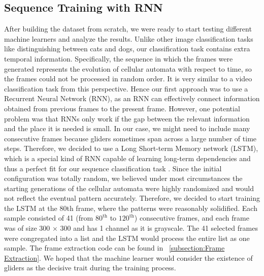 \documentclass[12pt]{article}
\numberwithin{figure}{section} %
\begin{document}
\subsection{Sequence Training with RNN}
After building the dataset from scratch, we were ready to start testing different machine learners and analyze the results. Unlike other image classification tasks like distinguishing between cats and dogs, our classification task contains extra temporal information. Specifically, the sequence in which the frames were generated represents the evolution of cellular automata with respect to time, so the frames could not be processed in random order. It is very similar to a video classification task from this perspective. Hence our first approach was to use a Recurrent Neural Network (RNN), as an RNN can effectively connect information obtained from previous frames to the present frame. However, one potential problem was that RNNs only work if the gap between the relevant information and the place it is needed is small. In our case, we might need to include many consecutive frames because gliders sometimes span across a large number of time steps. Therefore, we decided to use a Long Short-term Memory network (LSTM), which is a special kind of RNN capable of learning long-term dependencies and thus a perfect fit for our sequence classification task \cite{LSTM}. Since the initial configuration was totally random, we believed under most circumstances the starting generations of the cellular automata were highly randomized and would not reflect the eventual pattern accurately. Therefore, we decided to start training the LSTM at the 80th frame, where the patterns were reasonably solidified. Each sample consisted of 41 (from $80^{\text{th}}$ to $120^{\text{th}}$) consecutive frames, and each frame was of size 300 × 300 and has 1 channel as it is grayscale. The 41 selected frames were congregated into a list and the LSTM would process the entire list as one sample. The frame extraction code can be found in ~\ref{subsection:Frame Extraction}. We hoped that the machine learner would consider the existence of gliders as the decisive trait during the training process. 
\end{document}
